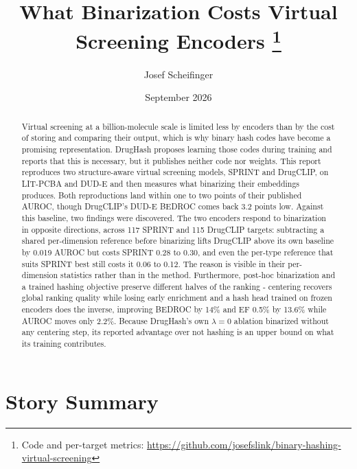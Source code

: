 \documentclass[10pt,a4paper]{article}
\title{What Binarization Costs Virtual Screening Encoders
\thanks{Code and per-target metrics:
\url{https://github.com/josefslink/binary-hashing-virtual-screening}}}
\author{Josef Scheifinger}
\date{September 2026}
\begin{document}
\maketitle

\begin{abstract}
Virtual screening at a billion-molecule scale is limited less by encoders than by the cost
of storing and comparing their output, which is why binary hash codes have become a promising
representation. DrugHash proposes learning those codes during training and reports that this
is necessary, but it publishes neither code nor weights. This report reproduces two
structure-aware virtual screening models, SPRINT and DrugCLIP, on LIT-PCBA and DUD-E and then
measures what binarizing their embeddings produces. Both reproductions land within one to two
points of their published AUROC, though DrugCLIP's DUD-E BEDROC comes back 3.2 points low. Against this baseline, two findings were discovered. The
two encoders respond to binarization in opposite directions, across 117 SPRINT and 115 DrugCLIP
targets: subtracting a shared per-dimension reference before binarizing lifts DrugCLIP above its
own baseline by 0.019 AUROC but costs SPRINT 0.28 to 0.30, and even the per-type reference that
suits SPRINT best still costs it 0.06 to 0.12. The reason is visible in their per-dimension
statistics rather than in the method. Furthermore, post-hoc
binarization and a trained hashing objective preserve different halves of the ranking -
centering recovers global ranking quality while losing early enrichment and a hash head
trained on frozen encoders does the inverse, improving BEDROC by 14\% and EF 0.5\% by 13.6\%
while AUROC moves only 2.2\%. Because DrugHash's own $\lambda = 0$ ablation binarized without
any centering step, its reported advantage over not hashing is an upper bound on what its
training contributes.
\end{abstract}

\section{Story Summary}\label{sec:story}
\end{document}
